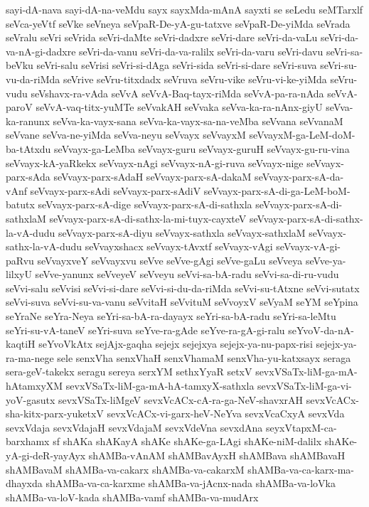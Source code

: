 {sayi-dA-nava
sayi-dA-na-veMdu
sayx
sayxMda-mAnA
sayxti
se
seLedu
seMTarxlf
seVca-yeVtf
seVke
seVneya
seVpaR-De-yA-gu-tatxve
seVpaR-De-yiMda
seVrada
seVralu
seVri
seVrida
seVri-daMte
seVri-dadxre
seVri-dare
seVri-da-vaLu
seVri-da-va-nA-gi-dadxre
seVri-da-vanu
seVri-da-va-ralilx
seVri-da-varu
seVri-davu
seVri-sa-beVku
seVri-salu
seVrisi
seVri-si-dAga
seVri-sida
seVri-si-dare
seVri-suva
seVri-su-vu-da-riMda
seVrive
seVru-titxdadx
seVruva
seVru-vike
seVru-vi-ke-yiMda
seVru-vudu
seVshavx-ra-vAda
seVvA
seVvA-Baq-tayx-riMda
seVvA-pa-ra-nAda
seVvA-paroV
seVvA-vaq-titx-yuMTe
seVvakAH
seVvaka
seVva-ka-ra-nAnx-giyU
seVva-ka-ranunx
seVva-ka-vayx-sana
seVva-ka-vayx-sa-na-veMba
seVvana
seVvanaM
seVvane
seVva-ne-yiMda
seVva-neyu
seVvayx
seVvayxM
seVvayxM-ga-LeM-doM-ba-tAtxdu
seVvayx-ga-LeMba
seVvayx-guru
seVvayx-guruH
seVvayx-gu-ru-vina
seVvayx-kA-yaRkekx
seVvayx-nAgi
seVvayx-nA-gi-ruva
seVvayx-nige
seVvayx-parx-sAda
seVvayx-parx-sAdaH
seVvayx-parx-sA-dakaM
seVvayx-parx-sA-da-vAnf
seVvayx-parx-sAdi
seVvayx-parx-sAdiV
seVvayx-parx-sA-di-ga-LeM-boM-batutx
seVvayx-parx-sA-dige
seVvayx-parx-sA-di-sathxla
seVvayx-parx-sA-di-sathxlaM
seVvayx-parx-sA-di-sathx-la-mi-tuyx-cayxteV
seVvayx-parx-sA-di-sathx-la-vA-dudu
seVvayx-parx-sA-diyu
seVvayx-sathxla
seVvayx-sathxlaM
seVvayx-sathx-la-vA-dudu
seVvayxshacx
seVvayx-tAvxtf
seVvayx-vAgi
seVvayx-vA-gi-paRvu
seVvayxveY
seVvayxvu
seVve
seVve-gAgi
seVve-gaLu
seVveya
seVve-ya-lilxyU
seVve-yanunx
seVveyeV
seVveyu
seVvi-sa-bA-radu
seVvi-sa-di-ru-vudu
seVvi-salu
seVvisi
seVvi-si-dare
seVvi-si-du-da-riMda
seVvi-su-tAtxne
seVvi-sutatx
seVvi-suva
seVvi-su-va-vanu
seVvitaH
seVvituM
seVvoyxV
seVyaM
seYM
seYpina
seYraNe
seYra-Neya
seYri-sa-bA-ra-dayayx
seYri-sa-bA-radu
seYri-sa-leMtu
seYri-su-vA-taneV
seYri-suva
seYve-ra-gAde
seYve-ra-gA-gi-ralu
seYvoV-da-nA-kaqtiH
seYvoVkAtx
sejAjx-gaqha
sejejx
sejejxya
sejejx-ya-nu-papx-risi
sejejx-ya-ra-ma-nege
sele
senxVha
senxVhaH
senxVhamaM
senxVha-yu-katxsayx
seraga
sera-geV-takekx
seragu
sereya
serxYM
sethxYyaR
setxV
sevxVSaTx-liM-ga-mA-hAtamxyXM
sevxVSaTx-liM-ga-mA-hA-tamxyX-sathxla
sevxVSaTx-liM-ga-vi-yoV-gasutx
sevxVSaTx-liMgeV
sevxVcACx-cA-ra-ga-NeV-shavxrAH
sevxVcACx-sha-kitx-parx-yuketxV
sevxVcACx-vi-garx-heV-NeYva
sevxVcaCxyA
sevxVda
sevxVdaja
sevxVdajaH
sevxVdajaM
sevxVdeVna
sevxdAna
seyxVtapxM-ca-barxhamx
sf
shAKa
shAKayA
shAKe
shAKe-ga-LAgi
shAKe-niM-dalilx
shAKe-yA-gi-deR-yayAyx
shAMBa-vAnAM
shAMBavAyxH
shAMBava
shAMBavaH
shAMBavaM
shAMBa-va-cakarx
shAMBa-va-cakarxM
shAMBa-va-ca-karx-ma-dhayxda
shAMBa-va-ca-karxme
shAMBa-va-jAcnx-nada
shAMBa-va-loVka
shAMBa-va-loV-kada
shAMBa-vamf
shAMBa-va-mudArx
}

